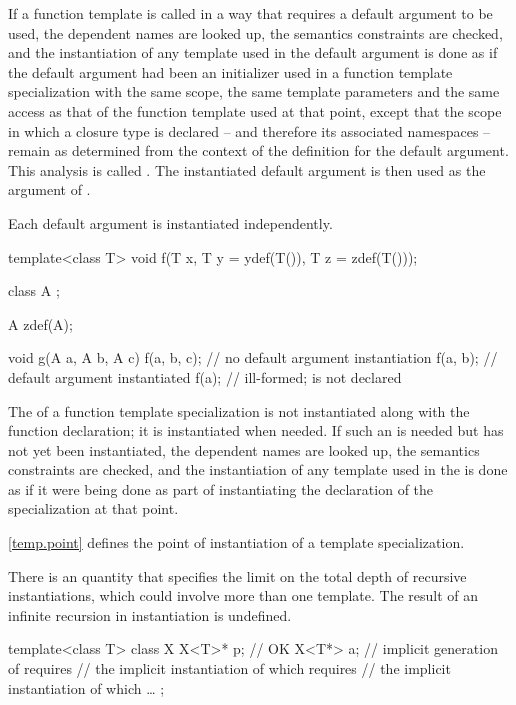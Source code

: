 \pnum
If a function template
is called in a way that requires a default argument to be used,
the dependent names are looked up, the semantics constraints are checked,
and the instantiation of any template used in the default argument
is done as if the default argument had been
an initializer used in a function template specialization with the same scope,
the same template parameters and the same access as that of the function template
used at that point, except that the scope in which a closure type is
declared -- and therefore its associated namespaces --
remain as determined from the context of the definition for the default
argument.
This analysis is called
.
The instantiated default argument is then used as the argument of
.

\pnum
Each default argument is instantiated independently.
\begin{example}

\begin{codeblock}
template<class T> void f(T x, T y = ydef(T()), T z = zdef(T()));

class  A { };

A zdef(A);

void g(A a, A b, A c) {
  f(a, b, c);       // no default argument instantiation
  f(a, b);          // default argument  instantiated
  f(a);             // ill-formed;  is not declared
}
\end{codeblock}
\end{example}

\pnum
The  of a function template specialization
is not instantiated along with the function declaration; it is instantiated
when needed. If such an
 is needed but has not yet been
instantiated, the dependent names are looked up, the semantics constraints are
checked, and the instantiation of any template used in the
 is done as if it were being done as part
of instantiating the declaration of the specialization at that point.

\pnum
\begin{note}
\ref{temp.point} defines the point of instantiation of a template specialization.
\end{note}

\pnum
There is an  quantity
that specifies the limit on the total depth of recursive instantiations,
which could involve more than one template.
The result of an infinite recursion in instantiation is undefined.
\begin{example}

\begin{codeblock}
template<class T> class X {
  X<T>* p;          // OK
  X<T*> a;          // implicit generation of  requires
                    // the implicit instantiation of  which requires
                    // the implicit instantiation of  which \ldots
};
\end{codeblock}
\end{example}

